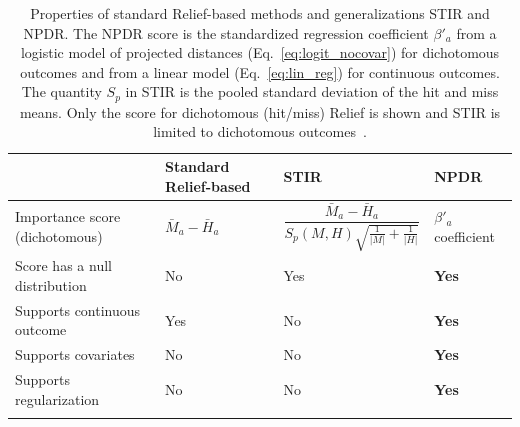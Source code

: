 \documentclass{bioinfo}
\begin{document}
\begin{table}[h]
\centering
\begin{tabular}{p{4.5cm}p{3cm}p{3.5cm}p{2.5cm}}
                           & Standard Relief-based & STIR    & NPDR \\
\hline
Importance score (dichotomous)  & $\bar{M}_a - \bar{H}_a$  & $\dfrac{\bar{M}_a - \bar{H}_a }{S_p(M,H)\sqrt{\frac{1}{|M|}+\frac{1}{|H|}}}$ &  $\beta'_a$ coefficient \\
Score has a null distribution & No                               & Yes     & {\bf Yes}  \\
Supports continuous outcome   & Yes                              & No      & {\bf Yes}  \\
Supports covariates           & No                               & No      & {\bf Yes} \\
Supports regularization           & No                               & No      & {\bf Yes} \\
\hline\\
\end{tabular}
\caption{Properties of standard Relief-based methods and generalizations STIR and NPDR. The NPDR score is the standardized regression coefficient $\beta'_a$ from a logistic model of projected distances (Eq.~\ref{eq:logit_nocovar}) for dichotomous outcomes and from a linear model (Eq.~\ref{eq:lin_reg}) for continuous outcomes. The quantity $S_p$ in STIR is the pooled standard deviation of the hit and miss means. Only the score for dichotomous (hit/miss) Relief is shown and STIR is limited to dichotomous outcomes~\citep{stir}.}
\label{tab:compare_npdr}
\end{table}


% 
\end{document}
